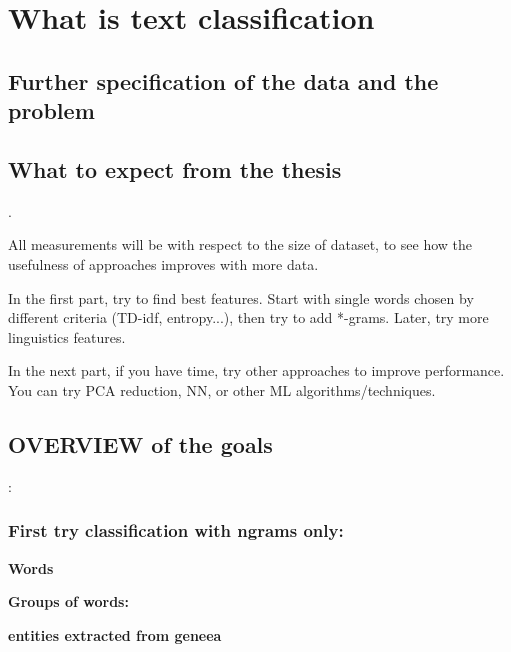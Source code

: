 \chapter{What is text classification}

\section{Further specification of the data and the problem}

\section{What to expect from the thesis}

.

All measurements will be with respect to the size of dataset, to see how the usefulness of approaches improves with more data.

In the first part, try to find best features. Start with single words chosen by different
criteria (TD-idf, entropy...), then try to add *-grams. Later, try more linguistics features.

In the next part, if you have time, try other approaches to improve performance. You can try PCA reduction, NN, or other ML algorithms/techniques.

\section{OVERVIEW of the goals}:

\subsection{First try classification with ngrams only:}

\bf Words \rm





\bf Groups of words: \rm

\bf entities extracted from geneea \rm


